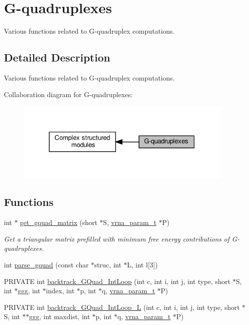 \hypertarget{group__gquads}{}\section{G-\/quadruplexes}
\label{group__gquads}


Various functions related to G-\/quadruplex computations.  




\subsection{Detailed Description}
Various functions related to G-\/quadruplex computations. 

Collaboration diagram for G-\/quadruplexes\+:
\nopagebreak
\begin{figure}[H]
\begin{center}
\leavevmode
\includegraphics[width=303pt]{group__gquads}
\end{center}
\end{figure}
\subsection*{Functions}
\begin{DoxyCompactItemize}
\item 
int $\ast$ \hyperlink{group__gquads_ga392e45c9615aa123737671603fa4203c}{get\+\_\+gquad\+\_\+matrix} (short $\ast$S, \hyperlink{group__energy__parameters_ga8a69ca7d787e4fd6079914f5343a1f35}{vrna\+\_\+param\+\_\+t} $\ast$P)
\begin{DoxyCompactList}\small\item\em Get a triangular matrix prefilled with minimum free energy contributions of G-\/quadruplexes. \end{DoxyCompactList}\item 
int \hyperlink{group__gquads_gae41763215b9c64d2a7b67f0df8a28078}{parse\+\_\+gquad} (const char $\ast$struc, int $\ast$L, int l\mbox{[}3\mbox{]})
\item 
P\+R\+I\+V\+A\+TE int \hyperlink{group__gquads_ga220c41e8dbcee940ac975b8ce88e55c5}{backtrack\+\_\+\+G\+Quad\+\_\+\+Int\+Loop} (int c, int i, int j, int type, short $\ast$S, int $\ast$ggg, int $\ast$index, int $\ast$p, int $\ast$q, \hyperlink{group__energy__parameters_ga8a69ca7d787e4fd6079914f5343a1f35}{vrna\+\_\+param\+\_\+t} $\ast$P)
\item 
P\+R\+I\+V\+A\+TE int \hyperlink{group__gquads_ga7b371308fa5a45c7ac353ef6ed1014de}{backtrack\+\_\+\+G\+Quad\+\_\+\+Int\+Loop\+\_\+L} (int c, int i, int j, int type, short $\ast$S, int $\ast$$\ast$ggg, int maxdist, int $\ast$p, int $\ast$q, \hyperlink{group__energy__parameters_ga8a69ca7d787e4fd6079914f5343a1f35}{vrna\+\_\+param\+\_\+t} $\ast$P)
\end{DoxyCompactItemize}


